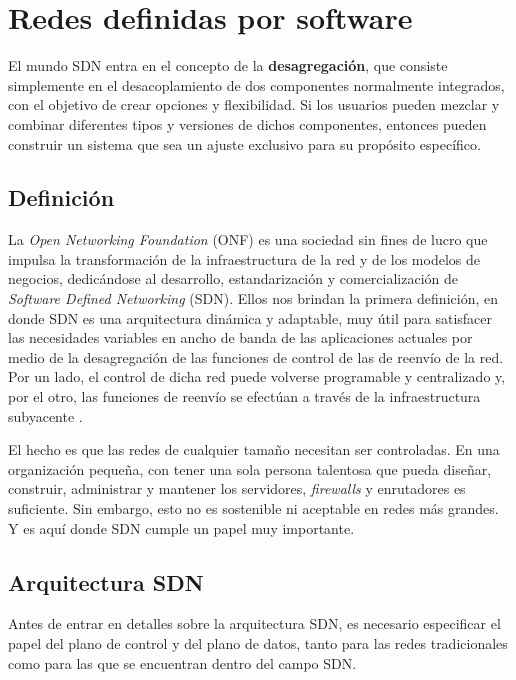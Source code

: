 \section{Redes definidas por software} \label{sec:sdn}

El mundo SDN entra en el concepto de la \textbf{desagregación}, que consiste
simplemente en el desacoplamiento de dos componentes normalmente integrados, con
el objetivo de crear opciones y flexibilidad. Si los usuarios pueden mezclar y
combinar diferentes tipos y versiones de dichos componentes, entonces pueden
construir un sistema que sea un ajuste exclusivo para su propósito específico.

\subsection{Definición} 

La \textit{Open Networking Foundation} (ONF) \parencite{onf} es una sociedad sin
fines de lucro que impulsa la transformación de la infraestructura de la red y
de los modelos de negocios, dedicándose al desarrollo, estandarización y
comercialización de \textit{Software Defined Networking} (SDN). Ellos nos
brindan la primera definición, en donde SDN es una arquitectura dinámica y
adaptable, muy útil para satisfacer las necesidades variables en ancho de banda
de las aplicaciones actuales por medio de la desagregación de las funciones de
control de las de reenvío de la red. Por un lado, el control de dicha red puede
volverse programable y centralizado y, por el otro, las funciones de reenvío se
efectúan a través de la infraestructura subyacente \parencite{def_citrix}.

El hecho es que las redes de cualquier tamaño necesitan ser controladas. En una
organización pequeña, con tener una sola persona talentosa que pueda diseñar,
construir, administrar y mantener los servidores, \textit{firewalls} y
enrutadores es suficiente. Sin embargo, esto no es sostenible ni aceptable en
redes más grandes. Y es aquí donde SDN cumple un papel muy importante.

\subsection{Arquitectura SDN} \label{sec:arch_SDN}
Antes de entrar en detalles sobre la arquitectura SDN, es necesario especificar
el papel del plano de control y del plano de datos, tanto para las redes
tradicionales como para las que se encuentran dentro del campo SDN.

